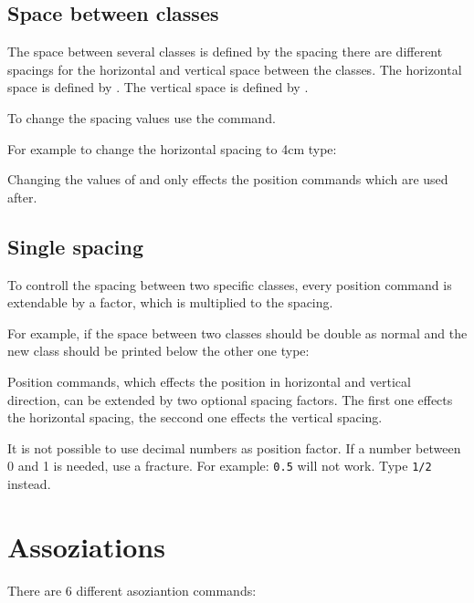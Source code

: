 \documentclass[parskip=full]{scrartcl}
\begin{document}
	\subsection{Space between classes}
	The space between several classes is defined by the spacing there are different spacings for the horizontal and vertical space between the classes. The horizontal space is defined by . The vertical space is defined by .
	
	To change the spacing values use the  command.
	
	For example to change the horizontal spacing to 4cm type:\\
	\begin{info}
		Changing the values of  and  only effects the position commands which are used after.
	\end{info}

	\subsection{Single spacing}
	To controll the spacing between two specific classes, every position command is extendable by a factor, which is multiplied to the spacing.
	
	For example, if the space between two classes should be double as normal and the new class should be printed below the other one type: 
	
	Position commands, which effects the position in horizontal and vertical direction, can be extended by two optional spacing factors. The first one effects the horizontal spacing, the seccond one effects the vertical spacing.
	
	\begin{attention}
		It is not possible to use decimal numbers as position factor. If a number between 0 and 1 is needed, use a fracture. For example: \texttt{0.5} will not work. Type \texttt{1/2} instead.
	\end{attention}

	\section{Assoziations}
	There are 6 different asoziantion commands:
	
\end{document}
